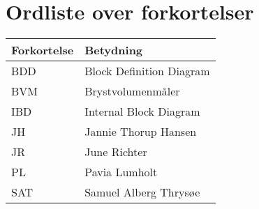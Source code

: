 \section*{Ordliste over forkortelser}

\vspace{1cm}
\begin{table}[hbt]
\centering
\label{ordliste}
\begin{tabular}{|l|l|}
\hline
\textbf{Forkortelse             } & \textbf{Betydning             } \\ \hline
BDD & Block Definition Diagram \\ \hline
BVM & Brystvolumenmåler \\ \hline
IBD & Internal Block Diagram \\ \hline 
JH & Jannie Thorup Hansen \\ \hline
JR & June Richter  \\ \hline
PL & Pavia Lumholt \\ \hline
SAT & Samuel Alberg Thrysøe \\ \hline
\end{tabular}
\end{table}